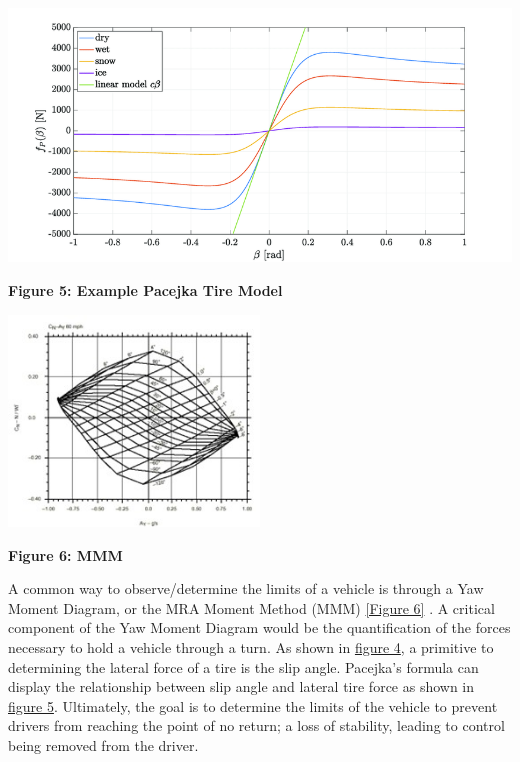 \documentclass[12pt]{article}
\begin{document}
        \begin{center}
            \vspace{0.5cm}

            \includegraphics[width=1\textwidth]{resources/Pacejkas-tire-model.png}

            \vspace{0.5cm}

            \textbf{Figure 5: Example Pacejka Tire Model} \autocite{pacejka}
            \label{pjka}
        
        \end{center}

        \begin{center}
            \vspace{0.5cm}

            \includegraphics[width=0.5\textwidth]{resources/tn_MMM807.jpg}

            \vspace{0.5cm}

            \textbf{Figure 6: MMM} \autocite{Milliken_Research_Associates}
            \label{MMMa}
        
        \end{center}

        A common way to observe/determine the limits of a vehicle is through a Yaw Moment Diagram, or the MRA Moment Method 
        (MMM) \hyperref[MMMa]{[Figure 6]} \autocite{Milliken_Research_Associates}. A critical component of the Yaw Moment Diagram would be the quantification of the forces necessary to hold 
        a vehicle through a turn. As shown in  \hyperref[tire_deformation_2]{figure 4}, a primitive to determining the lateral force of a tire is the slip angle. 
        Pacejka’s formula can display the relationship between slip angle and lateral tire force as shown in \hyperref[pjka]{figure 5}. Ultimately, 
        the goal is to determine the limits of the vehicle to prevent drivers from reaching the point of no return; a loss of 
        stability, leading to control being removed from the driver.
\end{document}
